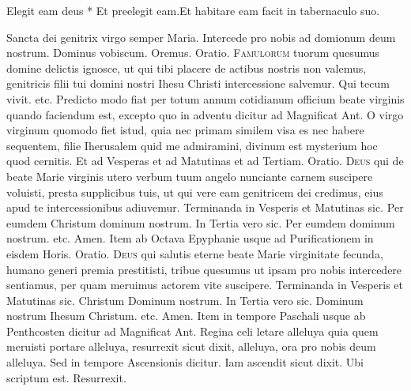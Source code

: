 \begin{multicols*}{2}
\begin{responsory-breve}
{Elegit eam deus * Et preelegit eam.}{Et habitare eam facit in tabernaculo suo.}
\end{responsory-breve}
\V Sancta dei genitrix virgo semper Maria. \R Intercede pro nobis ad domionum deum nostrum. Dominus vobiscum. {\color{Red} Oremus. Oratio.}
\lettrine[lines=2]{\zallmancaps \color{Blue} F}{amulorum} tuorum quesumus domine delictis ignosce, ut qui tibi placere de actibus nostris non valemus, genitricis filii tui domini nostri Ihesu Christi intercessione salvemur. Qui tecum vivit. etc.
{\color{Red} Predicto modo fiat per totum annum cotidianum officium beate virginis quando faciendum est, excepto quo in adventu dicitur ad Magnificat Ant.} O virgo virginum quomodo fiet istud, quia nec primam similem visa es nec habere sequentem, filie Iherusalem quid me admiramini, divinum est mysterium hoc quod cernitis. {\color{Red} Et ad Vesperas et ad Matutinas et ad Tertiam. Oratio.}
\lettrine[lines=2]{\zallmancaps \color{Red} D}{eus} qui de beate Marie virginis utero verbum tuum angelo nunciante carnem suscipere voluisti, presta supplicibus tuis, ut qui vere eam genitricem dei credimus, eius apud te intercessionibus adiuvemur.
{\color{Red} Terminanda in Vesperis et Matutinas sic.} Per eumdem Christum dominum nostrum. {\color{Red} In Tertia vero sic.} Per eumdem dominum nostrum. etc. Amen. {\color{Red} Item ab Octava Epyphanie usque ad Purificationem in eisdem Horis. Oratio.}
\lettrine[lines=2]{\zallmancaps \color{Blue} D}{eus} qui salutis eterne beate Marie virginitate fecunda, humano generi premia prestitisti, tribue quesumus ut ipsam pro nobis intercedere sentiamus, per quam meruimus actorem vite suscipere.
{\color{Red} Terminanda in Vesperis et Matutinas sic.} Christum Dominum nostrum. {\color{Red} In Tertia vero sic.} Dominum nostrum Ihesum Christum. etc. Amen. {\color{Red} Item in tempore Paschali usque ab Penthcosten dicitur ad Magnificat Ant.} Regina celi letare alleluya quia quem meruisti portare alleluya, resurrexit sicut dixit, alleluya, ora pro nobis deum alleluya.
{\color{Red} Sed in tempore Ascensionis dicitur.} Iam ascendit sicut dixit. {\color{Red} Ubi scriptum est.} Resurrexit.



\end{multicols*}




\thispagestyle{fancy}
\fancyhead[RO,LE]{\rightmark}

